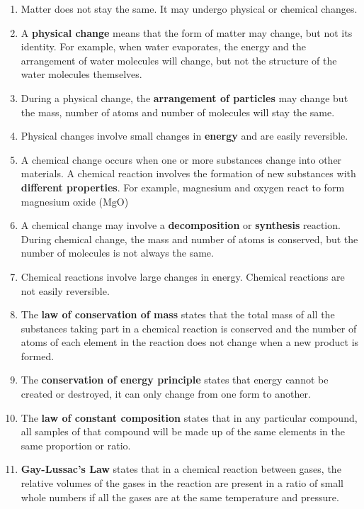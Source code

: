       \label{m38711*id65342}\begin{enumerate}[noitemsep, label=\textbf{\arabic*}. ] 
            \label{m38711*uid40}\item Matter does not stay the same. It may undergo physical or chemical changes.
\label{m38711*uid41}\item A \textbf{physical change} means that the form of matter may change, but not its identity. For example, when water evaporates, the energy and the arrangement of water molecules will change, but not the structure of the water molecules themselves.
\label{m38711*uid42}\item During a physical change, the \textbf{arrangement of particles} may change but the mass, number of atoms and number of molecules will stay the same.
\label{m38711*uid43}\item Physical changes involve small changes in \textbf{energy} and are easily reversible.
\label{m38711*uid44}\item A chemical change occurs when one or more substances change into other materials. A chemical reaction involves the formation of new substances with \textbf{different properties}. For example, magnesium and oxygen react to form magnesium oxide ($\text{MgO}$) \label{m38711*uid45}\item A chemical change may involve a \textbf{decomposition} or \textbf{synthesis} reaction. During chemical change, the mass and number of atoms is conserved, but the number of molecules is not always the same.
\label{m38711*uid46}\item Chemical reactions involve large changes in energy. Chemical reactions are not easily reversible.
\label{m38711*uid48}\item The \textbf{law of conservation of mass} states that the total mass of all the substances taking part in a chemical reaction is conserved and the number of atoms of each element in the reaction does not change when a new product is formed.
\label{m38711*uid49}\item The \textbf{conservation of energy principle} states that energy cannot be created or destroyed, it can only change from one form to another.
\label{m38711*uid50}\item The \textbf{law of constant composition} states that in any particular compound, all samples of that compound will be made up of the same elements in the same proportion or ratio.
\label{m38711*uid51}\item \textbf{Gay-Lussac's Law} states that in a chemical reaction between gases, the relative volumes of the gases in the reaction are present in a ratio of small whole numbers if all the gases are at the same temperature and pressure.
\end{enumerate}

